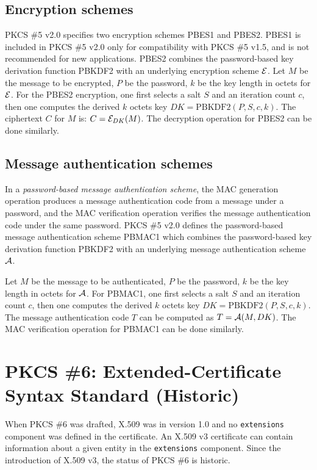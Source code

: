 \documentclass{article}
\begin{document}
\subsection{Encryption schemes}
PKCS \#5 v2.0 specifies two encryption schemes PBES1 and PBES2.
PBES1 is included in PKCS \#5 v2.0 only 
for compatibility with PKCS \#5 v1.5, and is not recommended 
for new applications.
PBES2 combines the password-based key derivation function PBKDF2 
with an underlying encryption scheme ${\cal E}$. Let $M$ be the 
message to be encrypted, $P$ be the password, $k$ be the key length
in octets for ${\cal E}$. For the PBES2 encryption, one first
selects a salt $S$ and an iteration count $c$, then one 
computes the derived $k$ octets key $DK = \mbox{PBKDF2}(P, S, c, k)$.
The ciphertext $C$ for $M$ is: $C={\cal E}_{DK}(M)$.
The decryption operation for PBES2 can be done similarly.

\subsection{Message authentication schemes}
In a {\em password-based message authentication scheme}, the
MAC generation operation produces a message authentication code
from a message under a password, and the MAC verification
operation verifies the message authentication 
code under the same password. PKCS \#5 v2.0 defines the password-based 
message authentication scheme PBMAC1 which combines the password-based 
key derivation function PBKDF2 with an underlying message authentication 
scheme ${\cal A}$. 

Let $M$ be the message to be authenticated, $P$ be the password, 
$k$ be the key length
in octets for ${\cal A}$. For PBMAC1, one first
selects a salt $S$ and an iteration count $c$, then one 
computes the derived $k$ octets key $DK = \mbox{PBKDF2}(P, S, c, k)$.
The message authentication code $T$ can be computed as
$T={\cal A}(M,DK)$. 
The MAC verification operation for PBMAC1 can be done similarly.

\section{PKCS \#6: Extended-Certificate Syntax Standard (Historic)} 
\label{pkcs6}
When PKCS \#6 was drafted, X.509 was in version 1.0
and no {\tt extensions} component was defined in the certificate. 
An X.509 v3 certificate can contain information about 
a given entity in the {\tt extensions} component.
Since the introduction of X.509 v3, the status of PKCS \#6 is historic.
\end{document}
